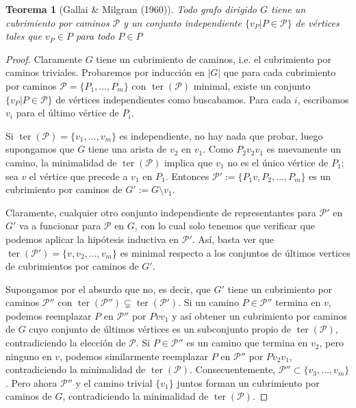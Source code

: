 \documentclass[12pt]{report}
\theoremstyle{plain}
\newtheorem{theorem}{Teorema}[section]
\theoremstyle{definition}
\newcommand{\abs}[1]{\left \vert #1 \right \vert}
\newcommand{\ter}[1]{\operatorname{ter} (#1)}
\begin{document}
\begin{theorem}[Gallai \& Milgram (1960)]\label{th:Gallai-Milgram - todo grafo dirigido tiene un cubrimiento por caminos dirigidos con un conjunto independiente formado por un elemento de cada camino}
Todo grafo dirigido $G$ tiene un cubrimiento por caminos $\mathcal P$ y un conjunto independiente $\{v_P | P \in \mathcal P \}$ de vértices tales que $v_P \in P$ para todo $P \in P$
\end{theorem}
\begin{proof}
Claramente $G$ tiene un cubrimiento de caminos, i.e. el cubrimiento por caminos triviales. Probaremos por inducción en $\abs G$ que para cada cubrimiento por caminos $\mathcal P = \{P_1, \ldots, P_m\}$ con $\ter {\mathcal{P}}$ minimal, existe un conjunto $\{v_P | P \in \mathcal P\}$ de vértices independientes como buscabamos. Para cada $i$, escribamos $v_i$ para el último vértice de $P_i$.

Si $\ter {\mathcal{P}} = \{v_1, \ldots, v_m \}$ es independiente, no hay nada que probar, luego supongamos que $G$ tiene una arista de $v_2$ en $v_1$. Como $P_2 v_2 v_1$ es nuevamente un camino, la minimalidad de $\ter {\mathcal{P}}$ implica que $v_1$ no es el único vértice de $P_1$; sea $v$ el vértice que precede a $v_1$ en $P_1$. Entonces $\mathcal P ' := \{ P_1 v , P_2, \ldots, P_m \}$ es un cubrimiento por caminos de $G' := G \setminus {v_1}$.


Claramente, cualquier otro conjunto independiente de representantes para $\mathcal P'$ en $G'$ va a funcionar para $\mathcal P$ en $G$, con lo cual solo tenemos que verificar que podemos aplicar la hipótesis inductiva en $\mathcal P '$. Así, basta ver que $\ter {\mathcal{P}'} = \{v,v_2,\ldots,v_m\}$ es minimal respecto a los conjuntos de últimos vertices de cubrimientos por caminos de $G'$.

Supongamos por el absurdo que no, es decir, que $G'$ tiene un cubrimiento por caminos $\mathcal {P}''$ con $\ter {\mathcal{P}''} \subsetneq \ter {\mathcal{P}'}$. Si un camino $P \in {\mathcal{P}''}$ termina en $v$, podemos reemplazar $P$ en ${\mathcal{P}''}$ por $P v v_1$ y así obtener un cubrimiento por caminos de $G$ cuyo conjunto de últimos vértices es un subconjunto propio de $\ter {\mathcal{P}}$, contradiciendo la elección de ${\mathcal{P}}$. Si $P \in {\mathcal{P}''}$ es un camino que termina en $v_2$, pero ninguno en $v$, podemos similarmente reemplazar $P$ en ${\mathcal{P}''}$ por $Pv_2v_1$, contradiciendo la minimalidad de $\ter {\mathcal{P}}$. Consecuentemente, ${\mathcal{P}''} \subset \{ v_3,\ldots, v_m \}$. Pero ahora ${\mathcal{P}''}$ y el camino trivial $\{v_1\}$ juntos forman un cubrimiento por caminos de $G$, contradiciendo la minimalidad de $\ter {\mathcal{P}}$.
\end{proof}
\end{document}
